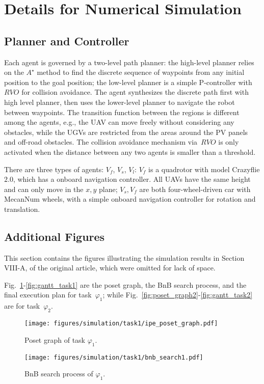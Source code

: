 \section{Details for Numerical Simulation}
\subsection{Planner and Controller}
Each agent is governed by a two-level path planner:
the high-level planner relies on the $A^\star$ method to find the
discrete sequence of waypoints from any initial position to the goal position;
the low-level planner is a simple P-controller with~$RVO$ for collision avoidance.
The agent synthesizes the discrete path first with high level planner,
then uses the lower-level planner to navigate the robot between waypoints.
The transition function between the regions is different among the agents, e.g.,
the UAV can move freely without considering any obstacles,
while the UGVs are restricted from the areas around the PV panels and off-road obstacles.
The collision avoidance mechanism via~$RVO$ is only activated
when the distance between any two agents is smaller than a threshold.

There are three types of agents: $V_f$, $V_s$, $V_l$:
$V_f$ is a quadrotor with model Crazyflie $2.0$,
which has a onboard navigation controller.
All UAVs have the same height and can only move in the $x,y$ plane;
$V_s, V_f$ are both four-wheel-driven car with  MecanNum wheels, with
a simple onboard navigation controller for rotation and translation.


\subsection{Additional Figures}
This section contains the figures illustrating the simulation results
in Section VIII-A,
of the original article, which were omitted for lack of space.

Fig.~\ref{fig:poset_graph1}-\ref{fig:gantt_task1} are the poset graph, the BnB search process,
and the final execution plan for task~$\varphi_1$;
while Fig.~\ref{fig:poset_graph2}-\ref{fig:gantt_task2} are for task~$\varphi_2$.
\begin{figure}[htbp]
		\centering%
		\texttt{[image: figures/simulation/task1/ipe\_poset\_graph.pdf]}
		\caption{Poset graph of task $\varphi_1$. }
                \label{fig:poset_graph1}
\end{figure}

\begin{figure}[htbp]
	\centering
	\texttt{[image: figures/simulation/task1/bnb\_search1.pdf]}
	\caption{ BnB search process of $\varphi_1$.}
        \label{fig:hesse_task1}
\end{figure}

